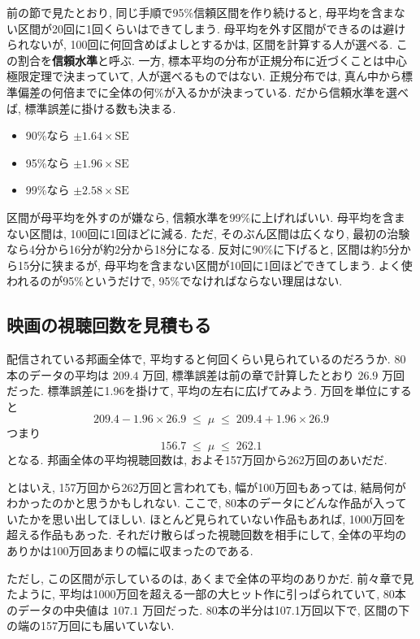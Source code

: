     前の節で見たとおり, 同じ手順で95\%信頼区間を作り続けると, 母平均を含まない区間が20回に1回くらいはできてしまう.
    母平均を外す区間ができるのは避けられないが, 100回に何回含めばよしとするかは, 区間を計算する人が選べる.
    この割合を\textbf{信頼水準}と呼ぶ.
    一方, 標本平均の分布が正規分布に近づくことは中心極限定理で決まっていて, 人が選べるものではない.
    正規分布では, 真ん中から標準偏差の何倍までに全体の何\%が入るかが決まっている.
    だから信頼水準を選べば, 標準誤差に掛ける数も決まる.
    \begin{itemize}
      \item 90\%なら $\pm 1.64 \times \mathrm{SE}$
      \item 95\%なら $\pm 1.96 \times \mathrm{SE}$
      \item 99\%なら $\pm 2.58 \times \mathrm{SE}$
    \end{itemize}

    区間が母平均を外すのが嫌なら, 信頼水準を99\%に上げればいい.
    母平均を含まない区間は, 100回に1回ほどに減る.
    ただ, そのぶん区間は広くなり, 最初の治験なら4分から16分が約2分から18分になる.
    反対に90\%に下げると, 区間は約5分から15分に狭まるが, 母平均を含まない区間が10回に1回ほどできてしまう.
    よく使われるのが95\%というだけで, 95\%でなければならない理屈はない.

  \subsection{映画の視聴回数を見積もる}

    配信されている邦画全体で, 平均すると何回くらい見られているのだろうか.
    80本のデータの平均は $209.4$ 万回, 標準誤差は前の章で計算したとおり $26.9$ 万回だった.
    標準誤差に1.96を掛けて, 平均の左右に広げてみよう.
    万回を単位にすると
    \[
      209.4 - 1.96 \times 26.9 \;\leq\; \mu \;\leq\; 209.4 + 1.96 \times 26.9
    \]
    つまり
    \[
      156.7 \;\leq\; \mu \;\leq\; 262.1
    \]
    となる.
    邦画全体の平均視聴回数は, およそ157万回から262万回のあいだだ.

    とはいえ, 157万回から262万回と言われても, 幅が100万回もあっては, 結局何がわかったのかと思うかもしれない.
    ここで, 80本のデータにどんな作品が入っていたかを思い出してほしい.
    ほとんど見られていない作品もあれば, 1000万回を超える作品もあった.
    それだけ散らばった視聴回数を相手にして, 全体の平均のありかは100万回あまりの幅に収まったのである.

    ただし, この区間が示しているのは, あくまで全体の平均のありかだ.
    前々章で見たように, 平均は1000万回を超える一部の大ヒット作に引っぱられていて, 80本のデータの中央値は $107.1$ 万回だった.
    80本の半分は107.1万回以下で, 区間の下の端の157万回にも届いていない.

